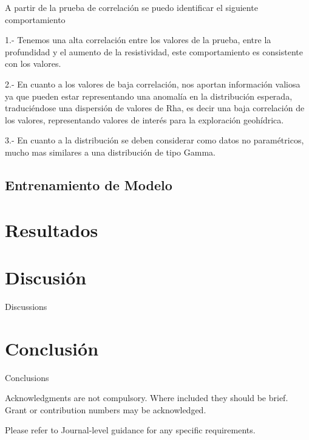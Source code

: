 \documentclass[sn-mathphys,Numbered]{sn-jnl}%
\theoremstyle{thmstyleone}%
\theoremstyle{thmstyletwo}%
\theoremstyle{thmstylethree}%
\begin{document}
A partir de la prueba de correlación se puedo identificar el siguiente comportamiento

1.- Tenemos una alta correlación entre los valores de la prueba, entre la profundidad y el aumento de la resistividad, este comportamiento es consistente con los valores.

2.- En cuanto a los valores de baja correlación, nos aportan información valiosa ya que pueden estar representando una anomalía en la distribución esperada, traduciéndose una dispersión de valores de Rha, es decir una baja correlación de los valores, representando valores de interés para la exploración geohídrica.

3.- En cuanto a la distribución se deben considerar como datos no paramétricos, mucho mas similares a una distribución de tipo Gamma.

\subsection{Entrenamiento de Modelo}\label{subsec6}


\section{Resultados}\label{sec4}


\section{Discusión}\label{sec5}

Discussions

\section{Conclusión}\label{sec6}

Conclusions





Acknowledgments are not compulsory. Where included they should be brief. Grant or contribution numbers may be acknowledged.

Please refer to Journal-level guidance for any specific requirements.
\end{document}
